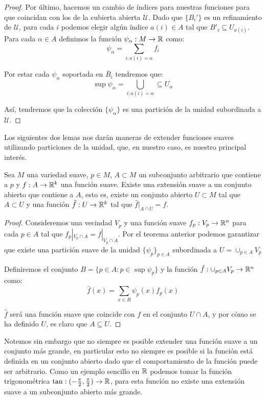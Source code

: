 \begin{proof}
	Por último, hacemos un cambio de índices para nuestras funciones para que coincidan con los de la cubierta abierta $\mathcal{U}$. Dado que $\{B_i'\}$ es un refinamiento de $\mathcal{U}$, para cada $i$ podemos elegir algún índice $a(i) \in A$ tal que $B'_i \subseteq U_{a(i)}$. Para cada $\alpha \in A$ definimos la función $\psi_\alpha: M \to \mathbb{R}$ como:
	\[
		\psi_\alpha = \sum_{i : a(i) = \alpha} f_i
	\]

	Por estar cada $\psi_\alpha$ soportada en $\overline{B}_{i}$ tendremos que:
	\[
		\sup \psi_{\alpha} = \bigcup_{i: a(i)=\alpha} \subseteq U_\alpha
	\]

	Así, tendremos que la colección $\{\psi_{\alpha}\}$ es una partición de la unidad subordinada a $\mathcal{U}$.
\end{proof}

Los siguientes dos lemas nos darán maneras de extender funciones suaves utilizando particiones de la unidad, que, en nuestro caso, es nuestro principal interés.

\begin{lemma}
	Sea $M$ una variedad suave, $p \in M$, $A \subset M$ un subconjunto arbitrario que contiene a $p$ y $f: A \to \mathbb{R}^{k}$ una función suave. Existe una extensión suave a un conjunto abierto que contiene a $A$, esto es, existe un conjunto abierto $U \subset M$ tal que $A \subset U$ y una función $\hat{f}: U \to \mathbb{R}^{k}$ tal que $\hat{f}|_{A \cap U} = f$.
\end{lemma}

\begin{proof}
	Consideremos una vecindad $V_p$ y una función suave $f_p: V_p \to \mathbb{R}^n$ para cada $p \in A$ tal que $f_{p}|_{V_p \cap A} = f|_{V_p \cap A}$. Por el teorema anterior podemos garantizar que existe una partición suave de la unidad $\{\psi_{p}\}_{p \in A}$ subordinada a $U=\cup_{p \in A}V_p$

	Definiremos el conjunto $B = \{p \in A: p \in \sup \psi_p\}$ y la función $\hat{f}: \cup_{p \in A} V_p \to \mathbb{R}^n$ como:
	\[
		\hat{f}(x) = \sum_{x \in B} \psi_p(x)f_p(x)
	\]

	$\hat{f}$ será una función suave que coincide con $f$ en el conjunto $U \cap A$, y por cómo se ha definido $U$, es claro que $A \subseteq U$.
\end{proof}

Notemos sin embargo que no siempre es posible extender una función suave a un conjunto más grande, en particular esto no siempre es posible si la función está definida en un conjunto abierto dado que el comportamiento de la función puede ser arbitrario. Como un ejemplo sencillo en $\mathbb{R}$ podemos tomar la función trigonométrica $\tan: (-\frac{\pi}{2}, \frac{\pi}{2}) \to \mathbb{R}$, para esta función no existe una extensión suave a un subconjunto abierto más grande.


